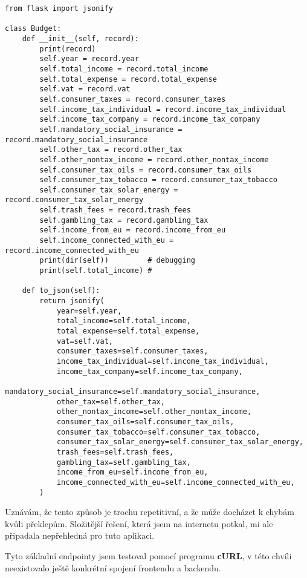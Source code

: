 \documentclass[11pt,a4paper,twoside,openright]{report}
\begin{document}
\begin{verbatim}
from flask import jsonify

class Budget:
    def __init__(self, record):
        print(record)
        self.year = record.year
        self.total_income = record.total_income
        self.total_expense = record.total_expense
        self.vat = record.vat
        self.consumer_taxes = record.consumer_taxes
        self.income_tax_individual = record.income_tax_individual
        self.income_tax_company = record.income_tax_company
        self.mandatory_social_insurance = record.mandatory_social_insurance
        self.other_tax = record.other_tax
        self.other_nontax_income = record.other_nontax_income
        self.consumer_tax_oils = record.consumer_tax_oils
        self.consumer_tax_tobacco = record.consumer_tax_tobacco
        self.consumer_tax_solar_energy = record.consumer_tax_solar_energy
        self.trash_fees = record.trash_fees
        self.gambling_tax = record.gambling_tax
        self.income_from_eu = record.income_from_eu
        self.income_connected_with_eu = record.income_connected_with_eu
        print(dir(self))         # debugging
        print(self.total_income) #

    def to_json(self):
        return jsonify(
            year=self.year,
            total_income=self.total_income,
            total_expense=self.total_expense,
            vat=self.vat,
            consumer_taxes=self.consumer_taxes,
            income_tax_individual=self.income_tax_individual,
            income_tax_company=self.income_tax_company,
            mandatory_social_insurance=self.mandatory_social_insurance,
            other_tax=self.other_tax,
            other_nontax_income=self.other_nontax_income,
            consumer_tax_oils=self.consumer_tax_oils,
            consumer_tax_tobacco=self.consumer_tax_tobacco,
            consumer_tax_solar_energy=self.consumer_tax_solar_energy,
            trash_fees=self.trash_fees,
            gambling_tax=self.gambling_tax,
            income_from_eu=self.income_from_eu,
            income_connected_with_eu=self.income_connected_with_eu,
        )
\end{verbatim}

Uznávám, že tento způsob je trochu repetitivní, a že může docházet k chybám kvůli překlepům. Složitější řešení,
která jsem na internetu potkal, mi ale připadala nepřehledná pro tuto aplikaci.

Tyto základní endpointy jsem testoval pomocí programu \textbf{cURL}, v této chvíli neexistovalo ještě konkrétní
spojení frontendu a backendu.
\end{document}
